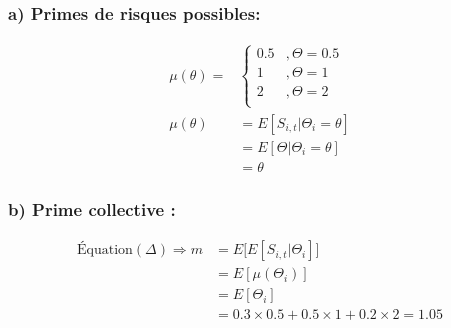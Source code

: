 \subsubsection*{a) Primes de risques possibles:}
\begin{align*}
\mu(\theta) = & \left\{
     \begin{array}{rl}
      0.5 &, \Theta = 0.5 \\
      1 &, \Theta = 1 \\
      2 &, \Theta = 2 \\
     \end{array}
     \right. \\
\mu(\theta) &= E[S_{i,t}|\Theta_i = \theta]\\
&= E[\Theta|\Theta_i = \theta] \\
&= \theta
\end{align*}

\subsubsection*{b) Prime collective :}
\begin{align*}
\text{Équation}(\Delta) \Rightarrow m &= E\Big[E[S_{i,t}|\Theta_i] \Big] \\
&= E[\mu(\Theta_i)]\\
&=E[\Theta_i]\\
&= 0.3 \times  0.5 + 0.5\times 1 + 0.2\times 2 = 1.05
\end{align*}

